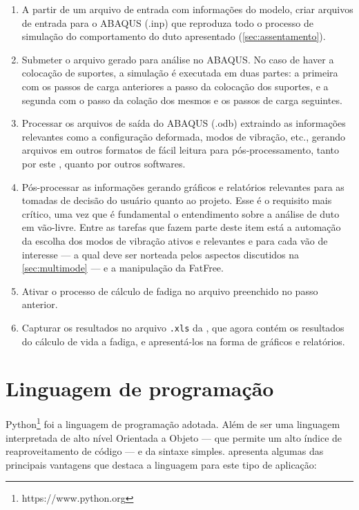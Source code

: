 \begin{enumerate}[label= (\arabic*)]
    \item A partir de um arquivo de entrada com informações do modelo, criar arquivos de entrada para o ABAQUS (.inp) que reproduza todo o processo de simulação do comportamento do duto apresentado (\autoref{sec:assentamento}).
    \item Submeter o arquivo gerado para análise no ABAQUS. No caso de haver a colocação de suportes, a simulação é executada em duas partes: a primeira com os passos de carga anteriores a passo da colocação dos suportes, e a segunda com o passo da colação dos mesmos e os passos de carga seguintes.
    \item Processar os arquivos de saída do ABAQUS (.odb) extraindo as informações relevantes como a configuração deformada, modos de vibração, etc., gerando arquivos em outros formatos de fácil leitura para pós-processamento, tanto por este \frame, quanto por outros softwares.
    \item Pós-processar as informações gerando gráficos e relatórios relevantes para as tomadas de decisão do usuário quanto ao projeto. Esse é o requisito mais crítico, uma vez que é fundamental o entendimento sobre a análise de duto em vão-livre. Entre as tarefas que fazem parte deste item está a automação da escolha dos modos de vibração ativos e relevantes e para cada vão de interesse --- a qual deve ser norteada pelos aspectos discutidos na \autoref{sec:multimode} --- e a manipulação da FatFree.
    \item Ativar o processo de cálculo de fadiga no arquivo preenchido no passo anterior.
    \item Capturar os resultados no arquivo \texttt{.xls} da \fatfree, que agora contém os resultados do cálculo de vida a fadiga, e apresentá-los na forma de gráficos e relatórios.
\end{enumerate}

\section{Linguagem de programação}

Python\footnote{https://www.python.org} foi a linguagem de programação adotada. Além de ser uma linguagem interpretada de alto nível Orientada a Objeto --- que permite um alto índice de reaproveitamento de código --- e da sintaxe simples.  apresenta algumas das principais vantagens que destaca a linguagem para este tipo de aplicação:

